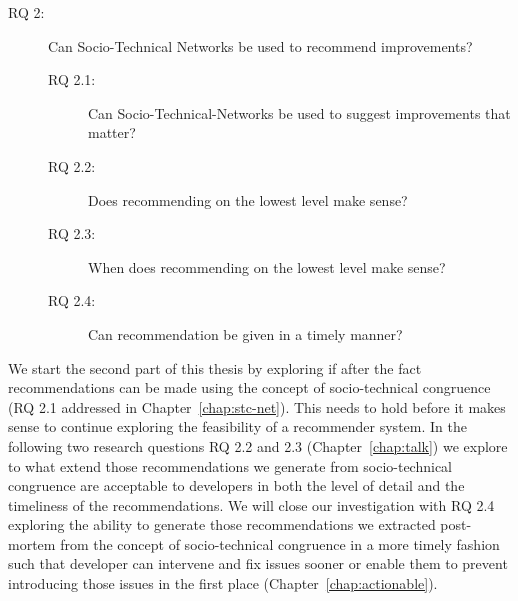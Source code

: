 \begin{description}
%
\item[RQ 2:] Can Socio-Technical Networks be used to recommend improvements? 
  \begin{description}
  \item[RQ 2.1:] Can Socio-Technical-Networks be used to suggest improvements that matter?
  \item[RQ 2.2:] Does recommending on the lowest level make sense?
  \item[RQ 2.3:] When does recommending on the lowest level make sense?
  \item[RQ 2.4:] Can recommendation be given in a timely manner?
  \end{description}
\end{description}

We start the second part of this thesis by exploring if after the fact recommendations can be made using the concept of socio-technical congruence (RQ 2.1 addressed in Chapter~\ref{chap:stc-net}).
This needs to hold before it makes sense to continue exploring the feasibility of a recommender system.
In the following two research questions RQ 2.2 and 2.3 (Chapter~\ref{chap:talk}) we explore to what extend those recommendations we generate from socio-technical congruence are acceptable to developers in both the level of detail and the timeliness of the recommendations.
We will close our investigation with RQ 2.4 exploring the ability to generate those recommendations we extracted post-mortem from the concept of socio-technical congruence in a more timely fashion such that developer can intervene and fix issues sooner or enable them to prevent introducing those issues in the first place (Chapter~\ref{chap:actionable}). 

